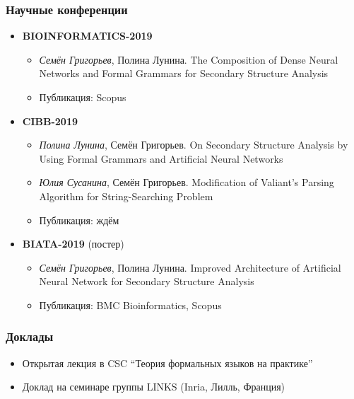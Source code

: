 \documentclass[xcolor=table]{beamer}
\begin{document}
\begin{frame}[fragile]
  \transwipe[direction=90]
  \frametitle{Научные конференции}
      \begin{itemize}

      \item \textbf{BIOINFORMATICS-2019}
      \begin{itemize}
        \item \emph{Семён Григорьев}, Полина Лунина. The Composition of Dense Neural Networks and Formal Grammars for Secondary Structure Analysis
        \item Публикация: Scopus
      \end{itemize}

      \item \textbf{CIBB-2019}
      \begin{itemize}
        \item \emph{Полина Лунина}, Семён Григорьев. On Secondary Structure Analysis by Using Formal Grammars and Artificial Neural Networks
        \item \emph{Юлия Сусанина}, Семён Григорьев. Modification of Valiant’s Parsing Algorithm for String-Searching Problem
        \item Публикация: ждём
      \end{itemize}

      \item \textbf{BIATA-2019} (постер)
      \begin{itemize}
         \item \emph{Семён Григорьев}, Полина Лунина. Improved Architecture of Artificial Neural Network for Secondary Structure Analysis
         \item Публикация: BMC Bioinformatics, Scopus
      \end{itemize}

\end{itemize}
\end{frame}

\begin{frame}[fragile]
  \transwipe[direction=90]
  \frametitle{Доклады}
\begin{itemize}

      \item Открытая лекция в CSC ``Теория формальных языков на практике''

      \item Доклад на семинаре группы LINKS (Inria, Лилль, Франция)

\end{itemize}
\end{frame}
\end{document}

